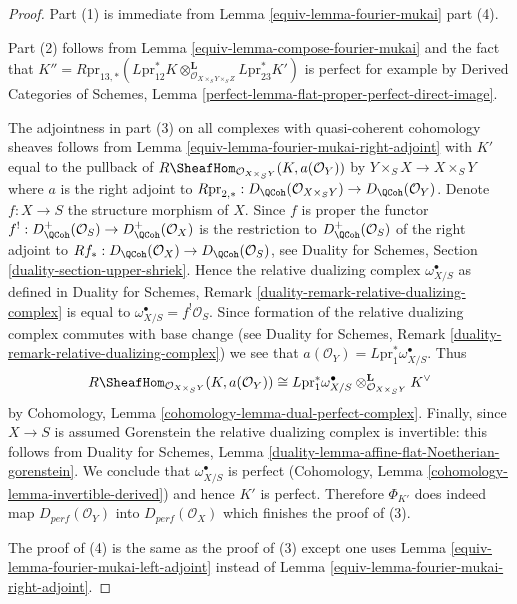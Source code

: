 \begin{proof}

Part (1) is immediate from Lemma \ref{equiv-lemma-fourier-mukai} part (4).

\medskip\noindent
Part (2) follows from Lemma \ref{equiv-lemma-compose-fourier-mukai} and the
fact that
$K'' = R\text{pr}_{13, *}(
L\text{pr}_{12}^*K
\otimes_{\mathcal{O}_{X \times_S Y \times_S Z}}^\mathbf{L}
L\text{pr}_{23}^*K')$ is perfect for example by
Derived Categories of Schemes, Lemma
\ref{perfect-lemma-flat-proper-perfect-direct-image}.

\medskip\noindent
The adjointness in part (3) on all complexes with quasi-coherent cohomology
sheaves follows from Lemma \ref{equiv-lemma-fourier-mukai-right-adjoint} with
$K'$ equal to the pullback of
$R\SheafHom_{\mathcal{O}_{X \times_S Y}}(K, a(\mathcal{O}_Y))$
by $Y \times_S X \to X \times_S Y$ where $a$ is the right adjoint
to $R\text{pr}_{2, *} : D_\QCoh(\mathcal{O}_{X \times_S Y}) \to
D_\QCoh(\mathcal{O}_Y)$. Denote $f : X \to S$ the structure morphism of $X$.
Since $f$ is proper the functor
$f^! : D_\QCoh^+(\mathcal{O}_S) \to D_\QCoh^+(\mathcal{O}_X)$
is the restriction to $D_\QCoh^+(\mathcal{O}_S)$
of the right adjoint to
$Rf_* : D_\QCoh(\mathcal{O}_X) \to D_\QCoh(\mathcal{O}_S)$, see
Duality for Schemes, Section \ref{duality-section-upper-shriek}.
Hence the relative dualizing complex $\omega_{X/S}^\bullet$ as defined in
Duality for Schemes, Remark
\ref{duality-remark-relative-dualizing-complex}
is equal to $\omega_{X/S}^\bullet = f^!\mathcal{O}_S$.
Since formation of the relative dualizing complex
commutes with base change (see Duality for Schemes, Remark
\ref{duality-remark-relative-dualizing-complex}) we see that
$a(\mathcal{O}_Y) = L\text{pr}_1^*\omega_{X/S}^\bullet$.
Thus
$$
R\SheafHom_{\mathcal{O}_{X \times_S Y}}(K, a(\mathcal{O}_Y))
\cong
L\text{pr}_1^*\omega_{X/S}^\bullet
\otimes_{\mathcal{O}_{X \times_S Y}}^\mathbf{L} K^\vee
$$
by Cohomology, Lemma \ref{cohomology-lemma-dual-perfect-complex}.
Finally, since $X \to S$ is assumed Gorenstein the relative dualizing complex
is invertible: this follows from Duality for Schemes, Lemma
\ref{duality-lemma-affine-flat-Noetherian-gorenstein}.
We conclude that $\omega_{X/S}^\bullet$ is perfect
(Cohomology, Lemma \ref{cohomology-lemma-invertible-derived})
and hence $K'$ is perfect.
Therefore $\Phi_{K'}$ does indeed map $D_{perf}(\mathcal{O}_Y)$
into $D_{perf}(\mathcal{O}_X)$ which finishes the proof of (3).

\medskip\noindent
The proof of (4) is the same as the proof of (3) except one uses
Lemma \ref{equiv-lemma-fourier-mukai-left-adjoint} instead of
Lemma \ref{equiv-lemma-fourier-mukai-right-adjoint}.
\end{proof}

